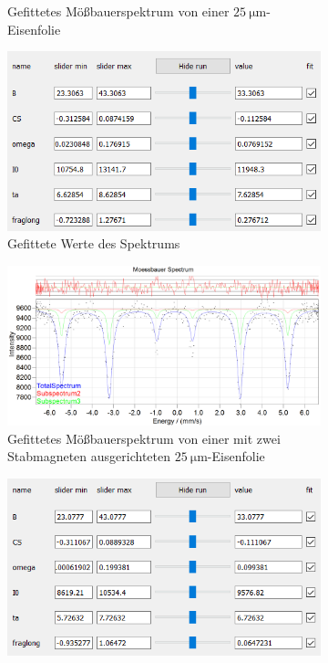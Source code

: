 \documentclass[german, %
parskip=full, %
bibliography=totoc, %
]{scrartcl}
\begin{document}
\begin{figure}[ht]
\begin{subfigure}[b]{0.5\textwidth}
	  \caption{Gefittetes Mößbauerspektrum von einer \(\SI{25}{\micro\meter}\)-Eisenfolie}
	  \label{fig:moess25fr}
  \end{subfigure}
  \begin{subfigure}[b]{0.4\textwidth}
	  \includegraphics[width=\textwidth]{WerteEisen25frag}
	  \caption{Gefittete Werte des Spektrums}
	  \label{fig:werte25fr}
  \end{subfigure}
	\begin{subfigure}[b]{0.5\textwidth}
		\includegraphics[width=\textwidth]{MoessbauerEisen25MagnetGeradefrag}
	  \caption{Gefittetes Mößbauerspektrum von einer mit zwei Stabmagneten ausgerichteten \(\SI{25}{\micro\meter}\)-Eisenfolie}
	  \label{fig:moess25geradefr}
  \end{subfigure}
  \begin{subfigure}[b]{0.4\textwidth}
	  \includegraphics[width=\textwidth]{WerteEisen25MagnetGeradefrag}

\end{subfigure}
\end{figure}
\end{document}

